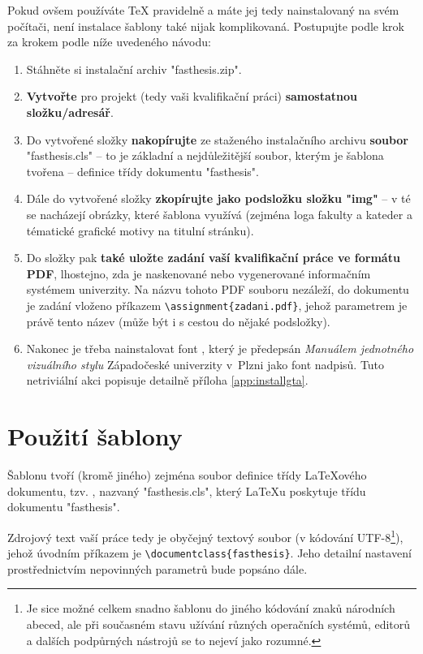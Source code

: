 \documentclass[czech, ing, kiv, he, iso690alph]{fasthesis}
\begin{document}
Pokud ovšem používáte \TeX{} pravidelně a máte jej tedy nainstalovaný na svém počítači, není instalace šablony také nijak komplikovaná. Postupujte podle krok za krokem podle níže uvedeného návodu:
\begin{enumerate}
\item Stáhněte si instalační archiv \filename"fasthesis.zip".
\item \textbf{Vytvořte} pro projekt (tedy vaši kvalifikační práci) \textbf{samostatnou složku/adresář}.
\item Do vytvořené složky \textbf{nakopírujte} ze staženého instalačního archivu \textbf{soubor} \filename"fasthesis.cls" -- to je základní a nejdůležitější soubor, kterým je šablona tvořena -- definice třídy dokumentu \filename"fasthesis".
\item Dále do vytvořené složky \textbf{zkopírujte jako podsložku složku \filename"img"} -- v té se nacházejí obrázky, které šablona využívá (zejména loga fakulty a kateder a tématické grafické motivy na titulní stránku).
\item Do složky pak \textbf{také uložte zadání vaší kvalifikační práce ve formátu PDF}, lhostejno, zda je naskenované nebo vygenerované informačním systémem univerzity. Na názvu tohoto PDF souboru nezáleží, do dokumentu je zadání vloženo příkazem \verb"\assignment{zadani.pdf}", jehož parametrem je právě tento název (může být i s cestou do nějaké podsložky).
\item Nakonec je třeba nainstalovat font , který je předepsán \emph{Manuálem jednotného vizuálního stylu} Západočeské univerzity v~Plzni jako font nadpisů. Tuto netriviální akci popisuje detailně příloha \ref{app:installgta}. 
\end{enumerate}
%
%
%
%
\chapter{Použití šablony}
Šablonu tvoří (kromě jiného) zejména soubor definice třídy \LaTeX{}ového dokumentu, tzv. , nazvaný \filename"fasthesis.cls", který \LaTeX{}u poskytuje třídu dokumentu \filename"fasthesis".

Zdrojový text vaší práce tedy je obyčejný textový soubor (v kódování UTF-8\footnote{Je sice možné celkem snadno šablonu  do jiného kódování znaků národních abeced, ale při současném stavu užívání různých operačních systémů, editorů a dalších podpůrných nástrojů se to nejeví jako rozumné.}), jehož úvodním příkazem je \verb"\documentclass{fasthesis}". Jeho detailní nastavení prostřednictvím nepovinných parametrů bude popsáno dále.
%
%
%
\end{document}
